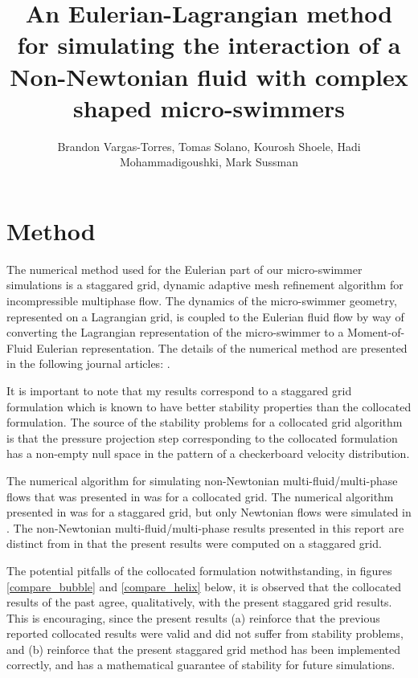 \documentclass[]{article}
\title{An Eulerian-Lagrangian method for simulating the interaction of a 
 Non-Newtonian fluid with complex shaped micro-swimmers}
\author{Brandon Vargas-Torres,
   Tomas Solano, Kourosh Shoele, Hadi Mohammadigoushki, Mark Sussman}
\begin{document}
\maketitle
\vspace*{-10mm}
\section*{Method} 
The numerical method used for the Eulerian part of
our micro-swimmer simulations is a staggared
grid, dynamic adaptive mesh refinement algorithm for 
incompressible multiphase flow.  
The dynamics of the micro-swimmer geometry, represented on a 
Lagrangian grid, is coupled to the Eulerian fluid flow by way of converting
the Lagrangian representation of the micro-swimmer to a
Moment-of-Fluid Eulerian representation.  The details of the numerical method
are presented in the following journal articles: 
\cite{dyadechko2005moment,ArientiSussman2014,peihierarchical,OHTA201966}.

It is important to note that my results correspond to a staggared grid 
formulation which is known to have better stability properties than the
collocated formulation\cite{rhie1983numerical}.  
The source of the stability problems for a collocated grid algorithm
is that the pressure projection step corresponding
to the collocated formulation has a non-empty null space in the pattern of
a checkerboard velocity distribution.

The numerical algorithm
for simulating non-Newtonian multi-fluid/multi-phase flows that was
presented in \cite{OHTA201966} was for a collocated grid.  The numerical
algorithm presented in \cite{peihierarchical} was for a staggared grid,
but only Newtonian flows were simulated in \cite{peihierarchical}.
The non-Newtonian multi-fluid/multi-phase results presented in 
this report are distinct from \cite{OHTA201966}
in that the present results were computed on a staggared grid.

The potential pitfalls of the collocated formulation notwithstanding,
in figures \ref{compare_bubble} and
\ref{compare_helix} below, it is observed that the collocated results of the
past agree, qualitatively, with the present staggared grid results.  This
is encouraging, since the present results (a) reinforce that the previous 
reported collocated results were valid and did not suffer from stability 
problems, and (b) reinforce that the present staggared grid method has 
been implemented correctly, and has a mathematical guarantee of 
stability\cite{GUITTET2015215} for future simulations.
\end{document}
